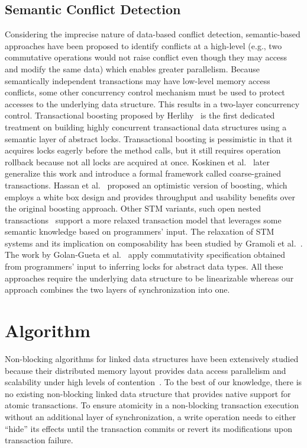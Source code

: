 \documentclass[10pt,conference,compsocconf]{IEEEtran}
\begin{document}
\subsection{Semantic Conflict Detection}
Considering the imprecise nature of data-based conflict detection, semantic-based approaches have been proposed to identify conflicts at a high-level (e.g., two commutative operations would not raise conflict even though they may access and modify the same data) which enables greater parallelism.
Because semantically independent transactions may have low-level memory access conflicts, some other concurrency control mechanism must be used to protect accesses to the underlying data structure.
This results in a two-layer concurrency control.
Transactional boosting proposed by Herlihy~\cite{herlihy2008transactional} is the first dedicated treatment on building highly concurrent transactional data structures using a semantic layer of abstract locks. 
Transactional boosting is pessimistic in that it acquires locks eagerly before the method calls, but it still requires operation rollback because not all locks are acquired at once.
Koskinen et al.~\cite{koskinen2010coarse} later generalize this work and introduce a formal framework called coarse-grained transactions.
Hassan et al.~\cite{hassan2014developing} proposed an optimistic version of boosting, which employs a white box design and provides throughput and usability benefits over the original boosting approach.
Other STM variants, such open nested transactions~\cite{ni2007open} support a more relaxed transaction model that leverages some semantic knowledge based on programmers' input.
The relaxation of STM systems and its implication on composability has been studied by Gramoli et al.~\cite{gramoli2013composing}.
The work by Golan-Gueta et al.~\cite{golan2015automatic} apply commutativity specification obtained from programmers' input to inferring locks for abstract data types.
All these approaches require the underlying data structure to be linearizable whereas our approach combines the two layers of synchronization into one.

\section{Algorithm}
\label{sec:algorithm}
Non-blocking algorithms for linked data structures have been extensively studied because their distributed memory layout provides data access parallelism and scalability under high levels of contention~\cite{linden2013skiplist,zhang2015lockfree,michael2002high}.
To the best of our knowledge, there is no existing non-blocking linked data structure that provides native support for atomic transactions.
To ensure atomicity in a non-blocking transaction execution without an additional layer of synchronization, a write operation needs to either ``hide'' its effects until the transaction commits or revert its modifications upon transaction failure.
\end{document}
